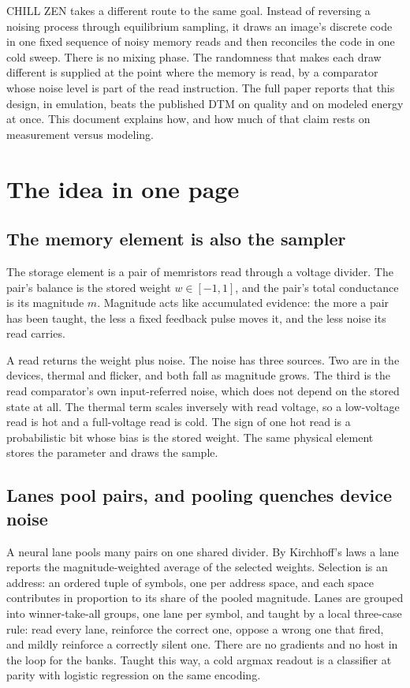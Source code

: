 \documentclass[reprint,amsmath,amssymb,aps,nofootinbib]{revtex4-2}
\begin{document}
CHILL ZEN takes a different route to the same goal. Instead of
reversing a noising process through equilibrium sampling, it draws an
image's discrete code in one fixed sequence of noisy memory reads and
then reconciles the code in one cold sweep. There is no mixing phase.
The randomness that makes each draw different is supplied at the point
where the memory is read, by a comparator whose noise level is part of
the read instruction. The full paper reports that this design, in
emulation, beats the published DTM on quality and on modeled energy at
once. This document explains how, and how much of that claim rests on
measurement versus modeling.

\section{The idea in one page}

\subsection{The memory element is also the sampler}

The storage element is a pair of memristors read through a voltage
divider. The pair's balance is the stored weight $w \in [-1, 1]$, and
the pair's total conductance is its magnitude $m$. Magnitude acts like
accumulated evidence: the more a pair has been taught, the less a
fixed feedback pulse moves it, and the less noise its read carries.

A read returns the weight plus noise. The noise has three sources. Two
are in the devices, thermal and flicker, and both fall as magnitude
grows. The third is the read comparator's own input-referred noise,
which does not depend on the stored state at all. The thermal term
scales inversely with read voltage, so a low-voltage read is hot and a
full-voltage read is cold. The sign of one hot read is a probabilistic
bit whose bias is the stored weight. The same physical element stores
the parameter and draws the sample.

\subsection{Lanes pool pairs, and pooling quenches device noise}

A neural lane pools many pairs on one shared divider. By Kirchhoff's
laws a lane reports the magnitude-weighted average of the selected
weights. Selection is an address: an ordered tuple of symbols, one per
address space, and each space contributes in proportion to its share
of the pooled magnitude. Lanes are grouped into winner-take-all groups,
one lane per symbol, and taught by a local three-case rule: read every
lane, reinforce the correct one, oppose a wrong one that fired, and
mildly reinforce a correctly silent one. There are no gradients and no
host in the loop for the banks. Taught this way, a cold argmax readout
is a classifier at parity with logistic regression on the same
encoding.
\end{document}
